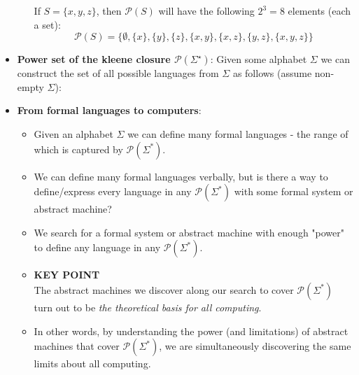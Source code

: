 \documentclass{report}
\begin{document}
\begin{itemize}
\begin{itemize}
                    If $S = \{x, y, z\}$, then $\mathcal{P}(S)$ will have the following $2^3 = 8$ elements (each a set):
                    \[
                        \mathcal{P}(S) = \{\emptyset, \{x\}, \{y\}, \{z\}, \{x, y\}, \{x, z\}, \{y, z\}, \{x, y, z\}\}
                    \]
            \end{itemize}
        \item \textbf{Power set of the kleene closure $\mathcal{P}(\Sigma^{\star}) $}: Given some alphabet $\Sigma$ we can construct the set of all possible languages from $\Sigma$ as follows (assume non-empty $\Sigma$):
            \bigbreak \noindent 
        \item \textbf{From formal languages to computers}:
            \begin{itemize}
                \item Given an alphabet $\Sigma$ we can define many formal languages - the range of which is captured by $\mathcal{P}(\Sigma^*)$.

                \item We can define many formal languages verbally, but is there a way to define/express every language in any $\mathcal{P}(\Sigma^*)$ with some formal system or abstract machine?

                \item We search for a formal system or abstract machine with enough "power" to define any language in any $\mathcal{P}(\Sigma^*)$.

                \item \textbf{KEY POINT} \\
                    The abstract machines we discover along our search to cover $\mathcal{P}(\Sigma^*)$ turn out to be \textit{the theoretical basis for all computing}.

                \item In other words, by understanding the power (and limitations) of abstract machines that cover $\mathcal{P}(\Sigma^*)$, we are simultaneously discovering the same limits about all computing.
            \end{itemize}
    \end{itemize}

    \pagebreak 
\end{document}
